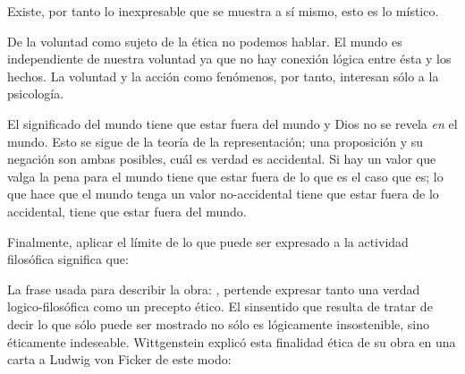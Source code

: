 Existe, por tanto lo inexpresable que se muestra a sí mismo, esto es lo
místico.\autocite[cf.~][6.522]{tractatus}

De la voluntad como sujeto de la ética no podemos
hablar\autocite[cf.~][6.423]{tractatus}. El mundo es independiente de nuestra
voluntad ya que no hay conexión lógica entre ésta y los hechos.
La voluntad y la acción como fenómenos, por tanto, interesan sólo a la
psicología.\autocite[cf.~][p.171 \S3]{IWT}

El significado del mundo tiene que estar fuera del
mundo\autocite[cf.~][6.41]{tractatus} y Dios no se revela \emph{en} el
mundo\autocite[cf.~][6.432]{tractatus}. 
Esto se sigue de la teoría de la representación; una proposición y su negación
son ambas posibles, cuál es verdad es accidental.\autocite[cf.~][p.170 \S4]{IWT}
Si hay un valor que valga la pena para el mundo tiene que estar fuera de lo que
es el caso que es; lo que hace que el mundo tenga un valor no-accidental tiene
que estar fuera de lo accidental, tiene que estar fuera del
mundo.\autocite[cf.~][6.41]{tractatus} 

Finalmente, aplicar el límite de lo que puede ser expresado a la actividad
filosófica significa que:

  La frase usada para describir la obra: , pertende expresar tanto una
  verdad logico-filosófica como un precepto ético. El sinsentido que resulta de
  tratar de decir lo que sólo puede ser mostrado no sólo es lógicamente
  insostenible, sino éticamente indeseable.\autocite[cf.~][p.~156]{monk1991duty}
  Wittgenstein explicó esta finalidad ética de su obra en una carta a Ludwig von
  Ficker de este modo: 


